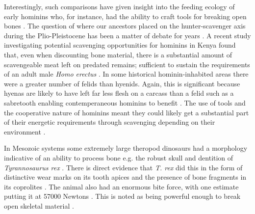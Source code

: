 \documentclass[a4paper,12pt]{article}
\begin{document}



Interestingly, such comparisons have given insight into the feeding ecology of early hominins who, for instance, had the ability to craft tools for breaking open bones \citep{ARCM:ARCM12084}.
The question of where our ancestors placed on the hunter-scavenger axis during the Plio-Pleistocene has been a matter of debate for years \citep{dominguez2002hunting}.
A recent study investigating potential scavenging opportunities for hominins in Kenya found that, even when discounting bone material, there is a substantial amount of scavengeable %
meat left on predated remains; sufficient to sustain the requirements of an adult male \textit{Homo erectus} \citep{pobiner2015new}.
In some historical hominin-inhabited areas there were a greater number of felids than hyenids.
Again, this is significant because hyenas are likely to have left far less flesh on a carcass than a felid such as a sabretooth enabling contemperaneous hominins to benefit \citep{pobiner2015new}.
The use of tools and the cooperative nature of hominins meant they could likely get a substantial part of their energetic requirements through scavenging depending on their environment \citep{moleon2014humans}. %


In Mesozoic systems some extremely large theropod dinosaurs had a morphology indicative of an ability to process bone e.g. the robust skull and dentition of \textit{Tyrannosaurus rex} \citep{hone2010feeding}.
There is direct evidence that \textit{T. rex} did this in the form of distinctive wear marks on its tooth apices \citep{farlow1994wear,schubert2005wear} and the presence of bone fragments in its coprolites \citep{chin1998king}.
The animal also had an enormous bite force, with one estimate putting it at 57000 Newtons \citep{bates2012estimating}. %
This is noted as being powerful enough to break open skeletal material \citep{rayfield2001cranial}.
\end{document}
